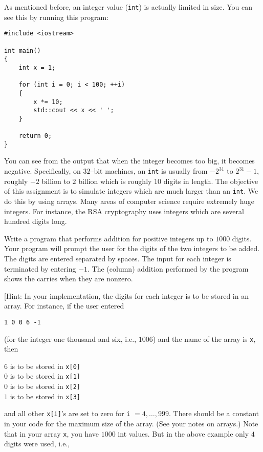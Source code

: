 As mentioned before, an integer value (\verb!int!)  is
actually limited in size. You can see this by running this program:

\begin{Verbatim}[frame=single]
#include <iostream>

int main()
{
    int x = 1;

    for (int i = 0; i < 100; ++i)
    {
        x *= 10;
        std::cout << x << ' ';
    }

    return 0;
}
\end{Verbatim}

You can see from the output that when the integer becomes too big, it becomes
negative. Specifically, on $32$--bit machines, an \verb!int! is usually from 
$-2^{31}$ to $2^{31} - 1$, roughly $-2$ billion to $2$ billion which is roughly
$10$ digits in length. The objective of this assignment is to simulate integers
which are much larger than an \verb!int!. We do this by using arrays. Many
areas of computer science require extremely huge integers. For instance, the
RSA cryptography uses integers which are several hundred digits long. 

Write a program that performs addition for positive integers up to $1000$
digits. Your program will prompt the user for the digits of the two integers to
be added. The digits are entered separated by spaces. The input for each
integer is terminated by entering $-1$. The (column) addition performed by the
program shows the carries when they are nonzero.

[Hint: In your implementation, the digits for each integer is to be stored in
an array. For instance, if the user entered 

\begin{center}
\verb!1 0 0 6 -1!
\end{center}

(for the integer one thousand and six, i.e., $1006$) and the name of the array
is \verb!x!, then
 
\begin{center}
$6$ is to be stored in \verb!x[0]! \\
$0$ is to be stored in \verb!x[1]! \\
$0$ is to be stored in \verb!x[2]! \\
$1$ is to be stored in \verb!x[3]! \\
\end{center}

and all other \verb!x[i]!'s are set to zero for \verb!i! $= 4, \ldots, 999$.
There should be a constant in your code for the maximum size of the array.
(See your notes on arrays.) Note that in your array \verb!x!, you have $1000$
int values. But in the above example only $4$ digits were used, i.e., 

